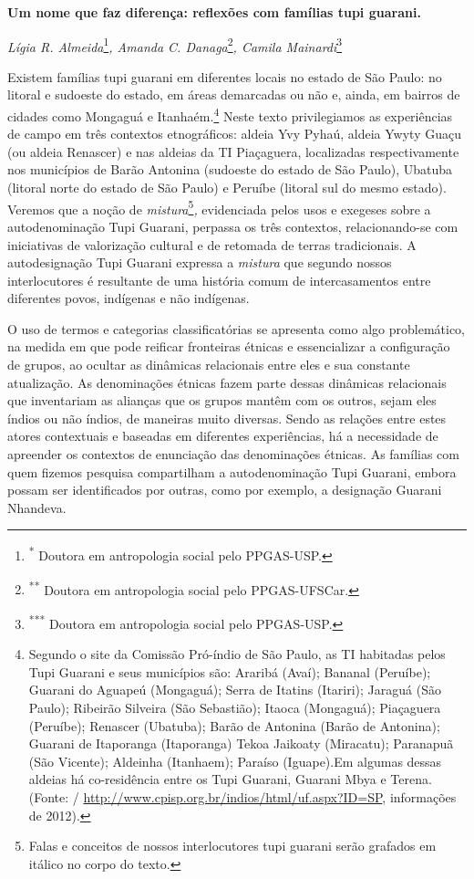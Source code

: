 \textbf{Um nome que faz diferença: reflexões com famílias tupi guarani.}

\emph{Lígia R. Almeida}\footnote{\textsuperscript{*} Doutora em
  antropologia social pelo PPGAS-USP.}\emph{, Amanda C.
Danaga}\footnote{\textsuperscript{**} Doutora em antropologia social
  pelo PPGAS-UFSCar.}\emph{, Camila Mainardi}\footnote{\textsuperscript{***}
  Doutora em antropologia social pelo PPGAS-USP.}

Existem famílias tupi guarani em diferentes locais no estado de São
Paulo: no litoral e sudoeste do estado, em áreas demarcadas ou não e,
ainda, em bairros de cidades como Mongaguá e Itanhaém.\footnote{Segundo
  o site da Comissão Pró-índio de São Paulo, as TI habitadas pelos Tupi
  Guarani e seus municípios são: Araribá (Avaí); Bananal (Peruíbe);
  Guarani do Aguapeú (Mongaguá); Serra de Itatins (Itariri); Jaraguá
  (São Paulo); Ribeirão Silveira (São Sebastião); Itaoca (Mongaguá);
  Piaçaguera (Peruíbe); Renascer (Ubatuba); Barão de Antonina (Barão de
  Antonina); Guarani de Itaporanga (Itaporanga) Tekoa Jaikoaty
  (Miracatu); Paranapuã (São Vicente); Aldeinha (Itanhaem); Paraíso
  (Iguape).Em algumas dessas aldeias há co-residência entre os Tupi
  Guarani, Guarani Mbya e Terena. (Fonte: /
  \url{http://www.cpisp.org.br/indios/html/uf.aspx?ID=SP}, informações
  de 2012).} Neste texto privilegiamos as experiências de campo em três
contextos etnográficos: aldeia Yvy Pyhaú, aldeia Ywyty Guaçu (ou aldeia
Renascer) e nas aldeias da TI Piaçaguera, localizadas respectivamente
nos municípios de Barão Antonina (sudoeste do estado de São Paulo),
Ubatuba (litoral norte do estado de São Paulo) e Peruíbe (litoral sul do
mesmo estado). Veremos que a noção de \emph{mistura}\footnote{Falas e
  conceitos de nossos interlocutores tupi guarani serão grafados em
  itálico no corpo do texto.}\emph{,} evidenciada pelos usos e exegeses
sobre a autodenominação Tupi Guarani, perpassa os três contextos,
relacionando-se com iniciativas de valorização cultural e de retomada de
terras tradicionais. A autodesignação Tupi Guarani expressa a
\emph{mistura} que segundo nossos interlocutores é resultante de uma
história comum de intercasamentos entre diferentes povos, indígenas e
não indígenas.

O uso de termos e categorias classificatórias se apresenta como algo
problemático, na medida em que pode reificar fronteiras étnicas e
essencializar a configuração de grupos, ao ocultar as dinâmicas
relacionais entre eles e sua constante atualização. As denominações
étnicas fazem parte dessas dinâmicas relacionais que inventariam as
alianças que os grupos mantêm com os outros, sejam eles índios ou não
índios, de maneiras muito diversas. Sendo as relações entre estes atores
contextuais e baseadas em diferentes experiências, há a necessidade de
apreender os contextos de enunciação das denominações étnicas. As
famílias com quem fizemos pesquisa compartilham a autodenominação Tupi
Guarani, embora possam ser identificados por outras, como por exemplo, a
designação Guarani Nhandeva.

